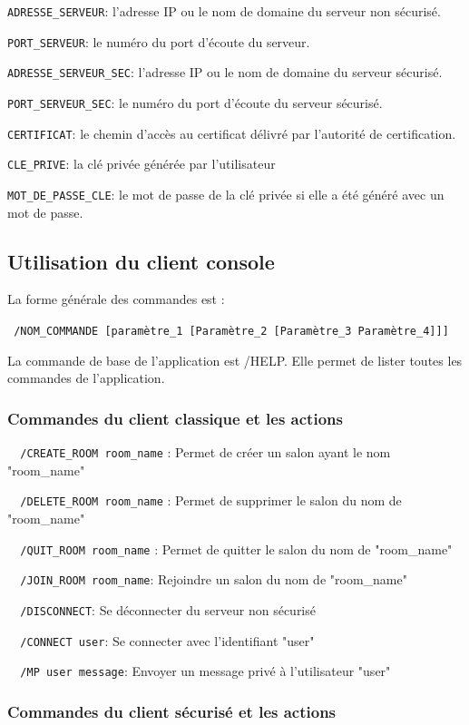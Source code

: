 \documentclass[a4paper,11pt,french]{book}
\begin{document}
\verb+ADRESSE_SERVEUR+: l'adresse IP ou le nom de domaine du serveur non sécurisé.

\verb+PORT_SERVEUR+: le numéro du port d'écoute du serveur.

\verb+ADRESSE_SERVEUR_SEC+: l'adresse IP ou le nom de domaine du serveur sécurisé.

\verb+PORT_SERVEUR_SEC+: le numéro du port d'écoute du serveur sécurisé.

\verb+CERTIFICAT+: le chemin d'accès au certificat délivré par l'autorité de certification.

\verb+CLE_PRIVE+: la clé privée générée par l'utilisateur

\verb+MOT_DE_PASSE_CLE+: le mot de passe de la clé privée si elle a été généré avec un mot de passe.

	
\subsection{Utilisation du client console}
	
	La forme générale des commandes est : 
	
\verb+ /NOM_COMMANDE [paramètre_1 [Paramètre_2 [Paramètre_3 Paramètre_4]]]+

La commande de base de l'application est /HELP. Elle permet de lister toutes les commandes de l'application.
\subsubsection{Commandes du client classique et les actions}

\verb+	/CREATE_ROOM room_name+  : Permet de créer un salon ayant le nom "room\_name"

\verb+	/DELETE_ROOM room_name+ :  Permet de supprimer le salon du nom de "room\_name"

\verb+	/QUIT_ROOM room_name+ :  Permet de quitter le salon du nom de "room\_name"

\verb+	/JOIN_ROOM room_name+:  Rejoindre un salon du nom de "room\_name"

\verb+	/DISCONNECT+: Se déconnecter du serveur non sécurisé

\verb+	/CONNECT user+:  Se connecter avec l'identifiant "user"

\verb+	/MP user message+: Envoyer un message privé à l'utilisateur "user"
			
\subsubsection{Commandes du client sécurisé et les actions}
\end{document}
